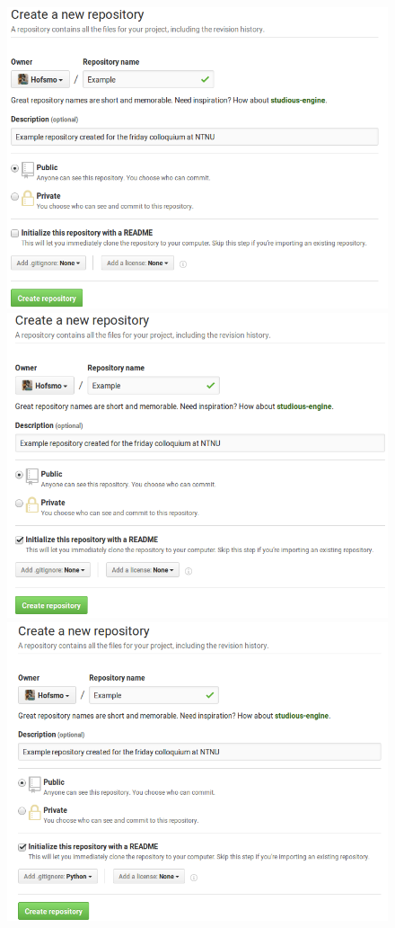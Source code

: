 \begin{frame}
\begin{columns}
\begin{column}{0.6\textwidth}
\begin{figure}
\begin{overprint}
					\includegraphics[width=\textwidth]{./pictures/rep_descr.png}
					\onslide<5>\includegraphics[width=\textwidth]{./pictures/rep_readme.png}
					\onslide<6>\includegraphics[width=\textwidth]{./pictures/rep_ignore.png}

\end{overprint}
\end{figure}
\end{column}
\end{columns}
\end{frame}

